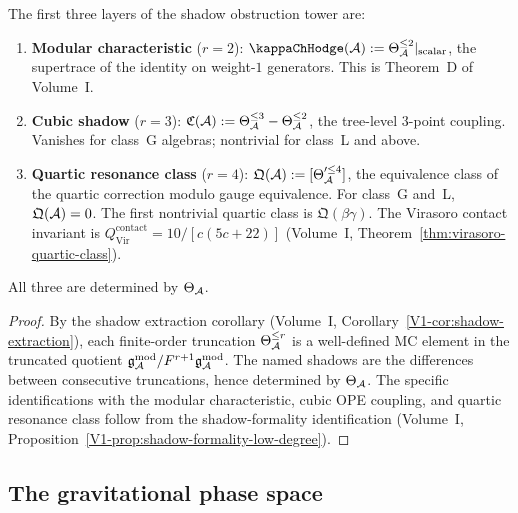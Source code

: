\begin{proposition}
The first three layers of the shadow obstruction tower are:
\begin{enumerate}[label=\textup{(\roman*)}]
\item \textbf{Modular characteristic} ($r=2$):
 $\kappaChHodge(\cA) := \Theta_\cA^{\le 2}|_{\text{scalar}}$, the
 supertrace of the identity on weight-$1$ generators. This is
 Theorem~D of Volume~I.
\item \textbf{Cubic shadow} ($r=3$):
 $\mathfrak{C}(\mathcal{A}) := \Theta_{\mathcal{A}}^{\le 3} - \Theta_{\mathcal{A}}^{\le 2}$,
 the tree-level $3$-point coupling. Vanishes for class~G algebras;
 nontrivial for class~L and above.
\item \textbf{Quartic resonance class} ($r=4$):
 $\mathfrak{Q}(\mathcal{A}) := [\Theta'^{\le 4}_{\mathcal{A}}]$, the equivalence class
 of the quartic correction modulo gauge equivalence. For class~G
 and~L, $\mathfrak{Q}(\mathcal{A}) = 0$. The first nontrivial quartic
 class is $\mathfrak{Q}(\beta\gamma)$.
 The Virasoro contact invariant is
 $Q^{\mathrm{contact}}_{\mathrm{Vir}} = 10/[c(5c+22)]$
 (Volume~I, Theorem~\ref{thm:virasoro-quartic-class}).
\end{enumerate}
All three are determined by $\Theta_{\mathcal{A}}$.
\end{proposition}

\begin{proof}
By the shadow extraction corollary
(Volume~I, Corollary~\ref*{V1-cor:shadow-extraction}), each finite-order
truncation $\Theta_{\mathcal{A}}^{\le r}$ is a well-defined MC element in the
truncated quotient $\mathfrak{g}_{\mathcal{A}}^{\mathrm{mod}} / F^{r+1}\mathfrak{g}_{\mathcal{A}}^{\mathrm{mod}}$. The named shadows are
the differences between consecutive truncations, hence determined
by $\Theta_{\mathcal{A}}$. The specific identifications with the modular
characteristic, cubic OPE coupling, and quartic resonance class
follow from the shadow-formality identification
(Volume~I, Proposition~\ref{V1-prop:shadow-formality-low-degree}).
\end{proof}


\subsection{The gravitational phase space}

